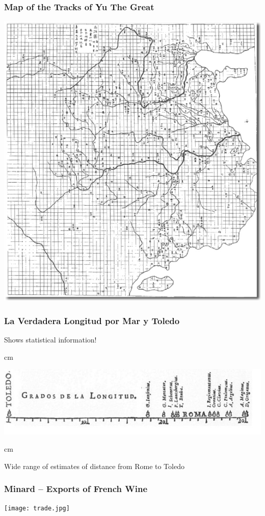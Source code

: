 \documentclass{beamer} %
\begin{document}
\begin{frame}\frametitle{Map of the Tracks of Yu The Great}
	\centering
	\includegraphics[width=0.7\linewidth]{yu.png}
\end{frame}




\begin{frame}\frametitle{La Verdadera Longitud por Mar y Toledo}
	\centering
	Shows statistical information!
	
	 cm
	
	\includegraphics[width=\linewidth]{longitud.jpg}
	
	 cm
	
	Wide range of estimates of distance from Rome to Toledo
\end{frame}



\begin{frame}\frametitle{Minard -- Exports of French Wine}
		\centering
	\texttt{[image: trade.jpg]}
\end{frame}
\end{document}
